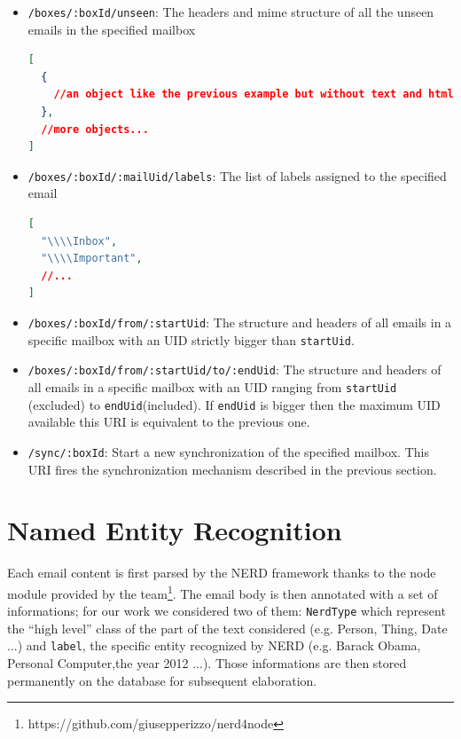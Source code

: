 \documentclass[a4paper,12pt]{report}
\begin{document}
\begin{itemize}
\begin{lstlisting}[language=JSON]
  ]
}
\end{lstlisting}
\item \texttt{/boxes/:boxId/unseen}: The headers and mime structure of  all the unseen emails in the specified mailbox
\begin{lstlisting}[language=JSON]
[
  {
    //an object like the previous example but without text and html 
  },
  //more objects...
]
\end{lstlisting}
\item \texttt{/boxes/:boxId/:mailUid/labels}: The list of labels assigned to the specified email
\begin{lstlisting}[language=JSON]
[
  "\\\\Inbox",
  "\\\\Important",
  //...
]
\end{lstlisting}
\item \texttt{/boxes/:boxId/from/:startUid}: The structure and headers of all emails in a specific mailbox with an UID strictly bigger than \texttt{startUid}.
\item \texttt{/boxes/:boxId/from/:startUid/to/:endUid}: The structure and headers of all emails in a specific mailbox with an UID ranging from \texttt{startUid} (excluded) to \texttt{endUid}(included). If \texttt{endUid} is bigger then the maximum UID available this URI is equivalent to the previous one.
\item \texttt{/sync/:boxId}: Start a new synchronization of the specified mailbox. This URI fires the synchronization mechanism described in the previous section.
\end{itemize}

\section{Named Entity Recognition}
Each email content is first parsed by the NERD framework thanks to the node module provided by the team\footnote{https://github.com/giusepperizzo/nerd4node}. The email body is then annotated with a set of informations; for our work we considered two of them: \texttt{NerdType} which represent the ``high level'' class of the part of the text considered (e.g. Person, Thing, Date ...) and \texttt{label}, the specific entity recognized by NERD (e.g. Barack Obama, Personal Computer,the year 2012 ...). 
Those informations are then stored permanently on the database for subsequent elaboration.
\end{document}
